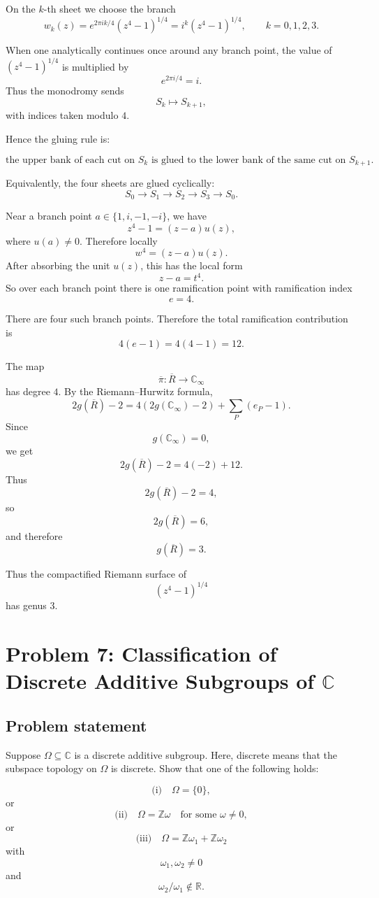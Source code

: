 \documentclass[12pt,a4paper]{article}
\theoremstyle{notespace}
\begin{document}
On the \(k\)-th sheet we choose the branch
\[
w_k(z)=e^{2\pi i k/4}(z^4-1)^{1/4}
=i^k(z^4-1)^{1/4},
\qquad k=0,1,2,3.
\]

When one analytically continues once around any branch point, the value of
\((z^4-1)^{1/4}\) is multiplied by
\[
e^{2\pi i/4}=i.
\]
Thus the monodromy sends
\[
S_k\longmapsto S_{k+1},
\]
with indices taken modulo \(4\).

Hence the gluing rule is:

\[
\boxed{
	\text{the upper bank of each cut on }S_k
	\text{ is glued to the lower bank of the same cut on }S_{k+1}.
}
\]

Equivalently, the four sheets are glued cyclically:
\[
S_0\to S_1\to S_2\to S_3\to S_0.
\]

Near a branch point \(a\in\{1,i,-1,-i\}\), we have
\[
z^4-1=(z-a)u(z),
\]
where \(u(a)\neq 0\). Therefore locally
\[
w^4=(z-a)u(z).
\]
After absorbing the unit \(u(z)\), this has the local form
\[
z-a=t^4.
\]
So over each branch point there is one ramification point with ramification
index
\[
e=4.
\]

There are four such branch points. Therefore the total ramification
contribution is
\[
4(e-1)=4(4-1)=12.
\]

The map
\[
\overline\pi:\overline R\to\mathbb C_\infty
\]
has degree \(4\). By the Riemann--Hurwitz formula,
\[
2g(\overline R)-2
=
4(2g(\mathbb C_\infty)-2)
+
\sum_P(e_P-1).
\]
Since
\[
g(\mathbb C_\infty)=0,
\]
we get
\[
2g(\overline R)-2
=
4(-2)+12.
\]
Thus
\[
2g(\overline R)-2=4,
\]
so
\[
2g(\overline R)=6,
\]
and therefore
\[
\boxed{g(\overline R)=3.}
\]

Thus the compactified Riemann surface of
\[
(z^4-1)^{1/4}
\]
has genus \(3\).	
	
\section{Problem 7: Classification of Discrete Additive Subgroups of \texorpdfstring{$\mathbb C$}{C}}

\subsection*{Problem statement}

Suppose \(\Omega\subseteq\mathbb C\) is a discrete additive subgroup.
Here, discrete means that the subspace topology on \(\Omega\) is discrete.
Show that one of the following holds:

\[
\text{(i)}\quad \Omega=\{0\},
\]
or
\[
\text{(ii)}\quad \Omega=\mathbb Z\omega
\quad\text{for some }\omega\neq 0,
\]
or
\[
\text{(iii)}\quad
\Omega=\mathbb Z\omega_1+\mathbb Z\omega_2
\]
with
\[
\omega_1,\omega_2\neq 0
\]
and
\[
\omega_2/\omega_1\notin\mathbb R.
\]
\end{document}
